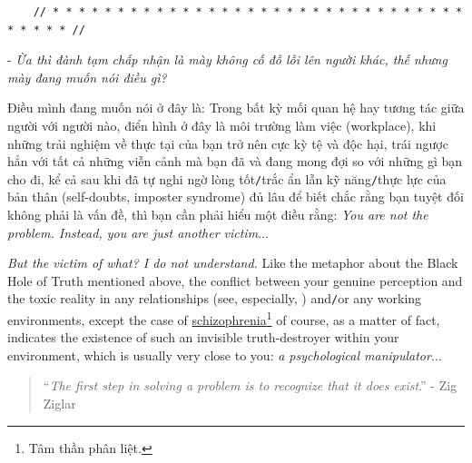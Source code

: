 \documentclass[12pt]{article}
\begin{document}
\begin{verbatim}
	// * * * * * * * * * * * * * * * * * * * * * * * * * * * * * * * * * * * * * //
\end{verbatim}

\noindent
{} - {\it Ừa thì đành tạm chấp nhận là mày không cố đỗ lỗi lên người khác, thế nhưng mày đang muốn nói điều gì?}

Điều mình đang muốn nói ở đây là: Trong bất kỳ mối quan hệ hay tương tác giữa người với người nào, điển hình ở đây là môi trường làm việc (workplace), khi những trải nghiệm về thực tại của bạn trở nên cực kỳ tệ và độc hại, trái ngược hẳn với tất cả những viễn cảnh mà bạn đã và đang mong đợi so với những gì bạn cho đi, kể cả sau khi đã tự nghi ngờ lòng tốt{\tt/}trắc ẩn lẫn kỹ năng{\tt/}thực lực của bản thân (self-doubts, imposter syndrome) đủ lâu để biết chắc rằng bạn tuyệt đối không phải là vấn đề, thì bạn cần phải hiểu một điều rằng: {\it You are not the problem. Instead, you are just another victim}$\ldots$

{\it But the victim of what? I do not understand.} Like the metaphor about the Black Hole of Truth mentioned above, the conflict between your genuine perception and the toxic reality in any relationships (see, especially, \cite{Bancroft2003}) and{\tt/}or any working environments, except the case of \href{https://en.wikipedia.org/wiki/Schizophrenia}{schizophrenia}\footnote{Tâm thần phân liệt.} of course, as a matter of fact, indicates the existence of such an invisible truth-destroyer within your environment, which is usually very close to you: {\it a psychological manipulator}$\ldots$

\begin{quotation}
	``{\it The first step in solving a problem is to recognize that it does exist}.'' - Zig Ziglar
\end{quotation}
\end{document}
